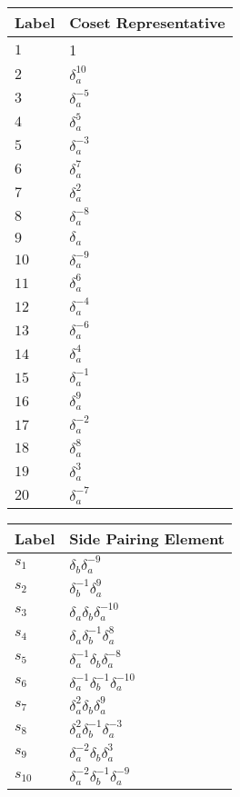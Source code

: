 \documentclass{article}
\begin{document}
\begin{center}
\begin{tabular}{ll}
\toprule
Label & Coset Representative\\
\midrule
$1$ & 1 \\
$2$ & $\delta_a^{10}$ \\
$3$ & $\delta_a^{-5}$ \\
$4$ & $\delta_a^{5}$ \\
$5$ & $\delta_a^{-3}$ \\
$6$ & $\delta_a^{7}$ \\
$7$ & $\delta_a^{2}$ \\
$8$ & $\delta_a^{-8}$ \\
$9$ & $\delta_a^{}$ \\
$10$ & $\delta_a^{-9}$ \\
$11$ & $\delta_a^{6}$ \\
$12$ & $\delta_a^{-4}$ \\
$13$ & $\delta_a^{-6}$ \\
$14$ & $\delta_a^{4}$ \\
$15$ & $\delta_a^{-1}$ \\
$16$ & $\delta_a^{9}$ \\
$17$ & $\delta_a^{-2}$ \\
$18$ & $\delta_a^{8}$ \\
$19$ & $\delta_a^{3}$ \\
$20$ & $\delta_a^{-7}$ \\
\bottomrule
\end{tabular}
\hfill
\begin{tabular}{ll}
\toprule
Label & Side Pairing Element\\
\midrule
$s_{1}$ & $\delta_b^{}\delta_a^{-9}$ \\
$s_{2}$ & $\delta_b^{-1}\delta_a^{9}$ \\
$s_{3}$ & $\delta_a^{}\delta_b^{}\delta_a^{-10}$ \\
$s_{4}$ & $\delta_a^{}\delta_b^{-1}\delta_a^{8}$ \\
$s_{5}$ & $\delta_a^{-1}\delta_b^{}\delta_a^{-8}$ \\
$s_{6}$ & $\delta_a^{-1}\delta_b^{-1}\delta_a^{-10}$ \\
$s_{7}$ & $\delta_a^{2}\delta_b^{}\delta_a^{9}$ \\
$s_{8}$ & $\delta_a^{2}\delta_b^{-1}\delta_a^{-3}$ \\
$s_{9}$ & $\delta_a^{-2}\delta_b^{}\delta_a^{3}$ \\
$s_{10}$ & $\delta_a^{-2}\delta_b^{-1}\delta_a^{-9}$ \\

\end{tabular}
\end{center}
\end{document}
